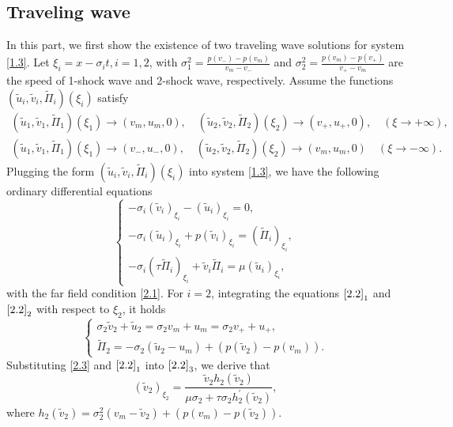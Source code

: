 \documentclass[10pt,reqno]{amsart}
\numberwithin{equation}{section}
\begin{document}
\subsection{Traveling wave}
In this part, we first show the existence of two traveling wave solutions for system \eqref{1.3}.
Let $\xi_{i}=x-\sigma_i t,i=1,2$, with $\sigma_1^2=\frac{p(v_-)-p(v_m)}{v_m-v_-}$ and $\sigma_2^2=\frac{p(v_m)-p(v_+)}{v_+-v_m}$ are the speed of 1-shock wave and 2-shock wave, respectively. Assume the functions $(\widetilde{u}_i,\widetilde{v}_i,\widetilde{\Pi}_i)(\xi_i)$ satisfy
\begin{equation}\label{2.1}
\begin{aligned}
(\widetilde{u}_1,\widetilde{v}_1,\widetilde{\Pi}_1)(\xi_1)\rightarrow(v_m,u_m,0),
\quad(\widetilde{u}_2,\widetilde{v}_2,\widetilde{\Pi}_2)(\xi_2)\rightarrow(v_+,u_+,0),\quad(\xi\rightarrow+\infty),\\
(\widetilde{u}_1,\widetilde{v}_1,\widetilde{\Pi}_1)(\xi_1)\rightarrow(v_-,u_-,0),\quad
(\widetilde{u}_2,\widetilde{v}_2,\widetilde{\Pi}_2)(\xi_2)\rightarrow(v_m,u_m,0)\quad(\xi\rightarrow-\infty).
\end{aligned}
\end{equation}
 Plugging the form $(\widetilde{u}_i,\widetilde{v}_i,\widetilde{\Pi}_i)(\xi_i)$ into system \eqref{1.3}, we have the following ordinary differential equations
\begin{equation}\label{2.2}
\begin{cases}
-\sigma_i(\widetilde{v}_i)_{\xi_i}-(\widetilde{u}_i)_{\xi_i}=0,\\
-\sigma_i(\widetilde{u}_i)_{\xi_i}+p(\widetilde{v}_i)_{\xi_i}=(\widetilde{\Pi}_i)_{\xi_i},\\
-\sigma_i(\tau\widetilde{\Pi}_i)_{\xi_i}+\widetilde{v}_i\widetilde{\Pi}_i=\mu(\widetilde{u}_i)_{\xi_i},
\end{cases}
\end{equation}
with the far field condition \eqref{2.1}. For $i=2$, integrating the equations $\eqref{2.2}_1$ and $\eqref{2.2}_2$ with respect to $\xi_2$, it holds
\begin{equation}\label{2.3}
\begin{cases}
\sigma_2\widetilde{v}_2+\widetilde{u}_2=\sigma_2 v_m+u_m=\sigma_2 v_++u_+,\\
\widetilde{\Pi}_2=-\sigma_2(\widetilde{u}_2-u_m)+(p(\widetilde{v}_2)-p(v_m)).
\end{cases}
\end{equation}
Substituting \eqref{2.3} and $\eqref{2.2}_1$ into $\eqref{2.2}_3$, we derive that
\begin{equation}\label{2.4}
(\widetilde{v}_2)_{\xi_2}=\frac{\widetilde{v}_2h_2(\widetilde{v}_2)}{\mu\sigma_2+\tau\sigma_2 h_2^{\prime}(\widetilde{v}_2)},
\end{equation}
where $h_2(\widetilde{v}_2)=\sigma_2^2(v_m-\widetilde{v}_2)+(p(v_m)-p(\widetilde{v}_2))$.
\end{document}
